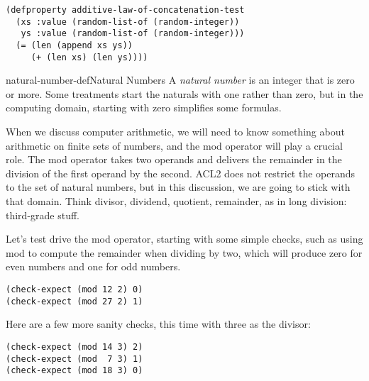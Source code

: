 \label{additive-lengths-test}
\begin{code}
\begin{verbatim}
(defproperty additive-law-of-concatenation-test
  (xs :value (random-list-of (random-integer))
   ys :value (random-list-of (random-integer)))
  (= (len (append xs ys))
     (+ (len xs) (len ys))))
\end{verbatim}
\end{code}

\begin{aside}{natural-number-def}{Natural Numbers}
A \emph{natural number} is
an integer that is zero or more.
Some treatments start the naturals with one
rather than zero, but in the computing domain,
starting with zero simplifies some formulas.
\end{aside}

When we discuss computer arithmetic, we will need to know something about
arithmetic on finite sets of numbers,  and the
\label{mod-function}\textsf{mod}
operator will play a crucial role.
The \textsf{mod} operator takes two operands and
delivers the remainder in the division of the first operand by the second.
ACL2 does not restrict the operands to the set of natural numbers,
but in this discussion, we are going to stick with that domain.
Think
divisor, dividend, quotient, remainder,
as in
long division:
third-grade stuff.

Let's test drive the \textsf{mod} operator, starting with
some simple checks, such as using \textsf{mod}
to compute the remainder when dividing by two,
which will produce zero for even numbers and one for odd numbers.

\begin{code}
\begin{verbatim}
(check-expect (mod 12 2) 0)
(check-expect (mod 27 2) 1)
\end{verbatim}
\end{code}

Here are a few more sanity checks, this time with three as the divisor:

\begin{code}
\begin{verbatim}
(check-expect (mod 14 3) 2)
(check-expect (mod  7 3) 1)
(check-expect (mod 18 3) 0)
\end{verbatim}
\end{code}


